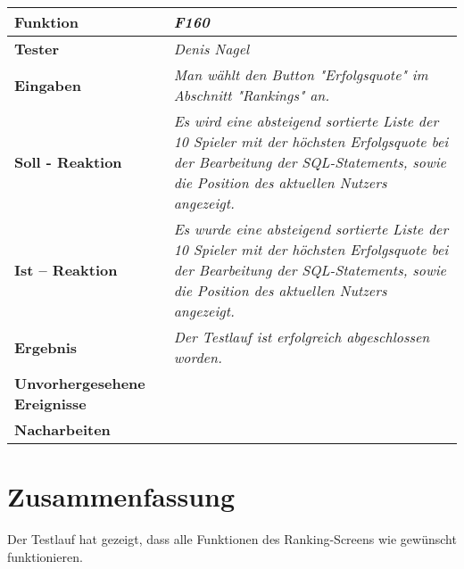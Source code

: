 \newpage
\begin{longtable}{|p{4cm}|p{11cm}|}
\hline
\textbf{Funktion} & \textit{\textbf{F160}} \\
\hline
\textbf{Tester} & \textit{Denis Nagel} \\
\hline
\textbf{Eingaben} & \textit{Man wählt den Button "Erfolgsquote" im Abschnitt "Rankings" an.} \\
\hline
\textbf{Soll - Reaktion} & \textit{Es wird eine absteigend sortierte Liste der 10 Spieler mit der höchsten Erfolgsquote bei der Bearbeitung der SQL-Statements, sowie die Position des aktuellen Nutzers angezeigt.} \\
\hline
\textbf{Ist -- Reaktion} & \textit{Es wurde eine absteigend sortierte Liste der 10 Spieler mit der höchsten Erfolgsquote bei der Bearbeitung der SQL-Statements, sowie die Position des aktuellen Nutzers angezeigt.} \\
\hline
\textbf{Ergebnis} & \textit{Der Testlauf ist erfolgreich abgeschlossen worden.} \\
\hline
\textbf{Unvorhergesehene Ereignisse} &
\textit{} \\
\hline
\textbf{Nacharbeiten } & \textit{} \\
\hline
\end{longtable}

\section{Zusammenfassung}

Der Testlauf hat gezeigt, dass alle Funktionen des Ranking-Screens wie gewünscht funktionieren.
